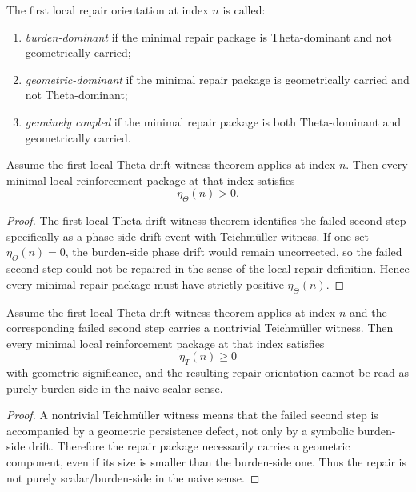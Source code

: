 \begin{definition}
\label{def:locally-coupled-repair-orientation}
The first local repair orientation at index \(n\) is called:
\begin{enumerate}
    \item \emph{burden-dominant} if the minimal repair package is Theta-dominant and not geometrically carried;
    \item \emph{geometric-dominant} if the minimal repair package is geometrically carried and not Theta-dominant;
    \item \emph{genuinely coupled} if the minimal repair package is both Theta-dominant and geometrically carried.
\end{enumerate}
\end{definition}

\begin{proposition}
\label{prop:theta-drift-witnesses-force-nonzero-burden-side-repair}
Assume the first local Theta-drift witness theorem applies at index \(n\).
Then every minimal local reinforcement package at that index satisfies
\[
\eta_{\Theta}(n) > 0.
\]
\end{proposition}

\begin{proof}
The first local Theta-drift witness theorem identifies the failed second step specifically as a phase-side drift event with Teichm\"uller witness.
If one set \(\eta_{\Theta}(n)=0\), the burden-side phase drift would remain uncorrected, so the failed second step could not be repaired in the sense of the local repair definition.
Hence every minimal repair package must have strictly positive \(\eta_{\Theta}(n)\).
\end{proof}

\begin{proposition}
\label{prop:teichmueller-witnesses-make-the-repair-geometrically-visible}
Assume the first local Theta-drift witness theorem applies at index \(n\) and the corresponding failed second step carries a nontrivial Teichm\"uller witness.
Then every minimal local reinforcement package at that index satisfies
\[
\eta_{T}(n)\ge 0
\]
with geometric significance, and the resulting repair orientation cannot be read as purely burden-side in the naive scalar sense.
\end{proposition}

\begin{proof}
A nontrivial Teichm\"uller witness means that the failed second step is accompanied by a geometric persistence defect, not only by a symbolic burden-side drift.
Therefore the repair package necessarily carries a geometric component, even if its size is smaller than the burden-side one.
Thus the repair is not purely scalar/burden-side in the naive sense.
\end{proof}

